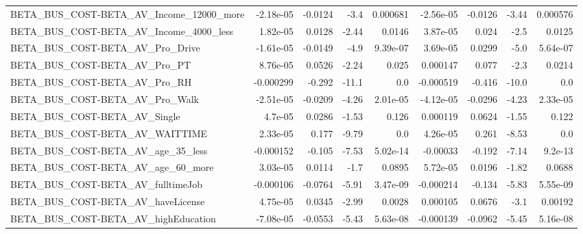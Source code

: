 \begin{tabular}{lrrrrrrrr}
BETA\_BUS\_COST-BETA\_AV\_Income\_12000\_more            &   -2.18e-05 &      -0.0124 &      -3.4 & 0.000681 &  -2.56e-05 &     -0.0126 &        -3.44 &      0.000576 \\
BETA\_BUS\_COST-BETA\_AV\_Income\_4000\_less             &    1.82e-05 &       0.0128 &     -2.44 &   0.0146 &   3.87e-05 &       0.024 &         -2.5 &        0.0125 \\
BETA\_BUS\_COST-BETA\_AV\_Pro\_Drive                    &   -1.61e-05 &      -0.0149 &      -4.9 & 9.39e-07 &   3.69e-05 &      0.0299 &         -5.0 &      5.64e-07 \\
BETA\_BUS\_COST-BETA\_AV\_Pro\_PT                       &    8.76e-05 &       0.0526 &     -2.24 &    0.025 &   0.000147 &       0.077 &         -2.3 &        0.0214 \\
BETA\_BUS\_COST-BETA\_AV\_Pro\_RH                       &   -0.000299 &       -0.292 &     -11.1 &      0.0 &  -0.000519 &      -0.416 &        -10.0 &           0.0 \\
BETA\_BUS\_COST-BETA\_AV\_Pro\_Walk                     &   -2.51e-05 &      -0.0209 &     -4.26 & 2.01e-05 &  -4.12e-05 &     -0.0296 &        -4.23 &      2.33e-05 \\
BETA\_BUS\_COST-BETA\_AV\_Single                       &     4.7e-05 &       0.0286 &     -1.53 &    0.126 &   0.000119 &      0.0624 &        -1.55 &         0.122 \\
BETA\_BUS\_COST-BETA\_AV\_WAITTIME                     &    2.33e-05 &        0.177 &     -9.79 &      0.0 &   4.26e-05 &       0.261 &        -8.53 &           0.0 \\
BETA\_BUS\_COST-BETA\_AV\_age\_35\_less                  &   -0.000152 &       -0.105 &     -7.53 & 5.02e-14 &   -0.00033 &      -0.192 &        -7.14 &       9.2e-13 \\
BETA\_BUS\_COST-BETA\_AV\_age\_60\_more                  &    3.03e-05 &       0.0114 &      -1.7 &   0.0895 &   5.72e-05 &      0.0196 &        -1.82 &        0.0688 \\
BETA\_BUS\_COST-BETA\_AV\_fulltimeJob                  &   -0.000106 &      -0.0764 &     -5.91 & 3.47e-09 &  -0.000214 &      -0.134 &        -5.83 &      5.55e-09 \\
BETA\_BUS\_COST-BETA\_AV\_haveLicense                  &    4.75e-05 &       0.0345 &     -2.99 &   0.0028 &   0.000105 &      0.0676 &         -3.1 &       0.00192 \\
BETA\_BUS\_COST-BETA\_AV\_highEducation                &   -7.08e-05 &      -0.0553 &     -5.43 & 5.63e-08 &  -0.000139 &     -0.0962 &        -5.45 &      5.16e-08 \\

\end{tabular}
